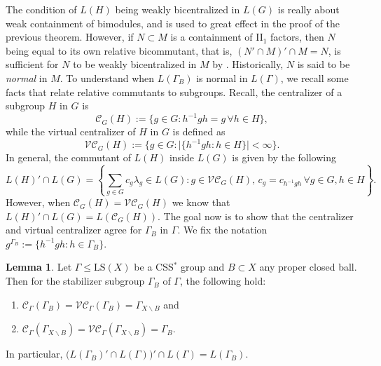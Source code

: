 \documentclass[12pt]{amsart}
\numberwithin{equation}{subsection}
\theoremstyle{definition}
\newtheorem{lemma}[theorem]{Lemma}
\theoremstyle{definition}
\theoremstyle{remark}
\begin{document}
The condition of $L(H)$ being weakly bicentralized in $L(G)$ is really about weak containment of bimodules, and is used to great effect in the proof of the previous theorem. However, if $N \subset M$ is a containment of II$_1$ factors, then $N$ being equal to its own relative bicommutant, that is, $(N ' \cap M )' \cap M = N$, is sufficient for $N$ to be weakly bicentralized in $M$ by \cite[Lemma 3.4]{BannonFull2020}. Historically, $N$ is said to be \emph{normal} in $M$. To understand when $L(\Gamma_B)$ is normal in $L(\Gamma)$, we recall some facts that relate relative commutants to subgroups. Recall, the centralizer of a subgroup $H$ in $G$ is
\[\mathcal{C}_G(H):=\{g\in G: h^{-1}gh=g\, \forall h\in H\},\]
while the virtual centralizer of $H$ in $G$ is defined as
\[\mathcal{VC}_G(H) := \{g\in G : \vert\{h^{-1}gh: h \in H\}\vert < \infty \}.\] 
In general, the commutant of $L(H)$ inside $L(G)$ is given by the following
\[L(H)'\cap L(G)= \left\{ \sum_{g\in G }c_g \lambda_g\in L(G) :  g\in \mathcal{VC}_G(H),\,  c_{g}=c_{h^{-1}gh}\,\forall g\in G,h\in H\right\}.\]
However, when $\mathcal{C}_G(H) = \mathcal{VC}_G(H)$ we know that $L(H)'\cap L(G) = L(\mathcal{C}_G(H))$. The goal now is to show that the centralizer and virtual centralizer agree for $\Gamma_B$ in $\Gamma$. We fix the notation $g^{\Gamma_B} :=\{h^{-1}gh : h \in \Gamma_B \}$.



\begin{lemma}\label{lemma:wkbicentral}
    Let $\Gamma \leq \text{LS}(X)$ be a CSS$^*$ group and $B \subset X$ any proper closed ball. Then for the stabilizer subgroup $\Gamma_B$ of $ \Gamma$, the following hold:
    \begin{enumerate}
        \item \label{vc:1}$\mathcal{C}_\Gamma(\Gamma_B)  = \mathcal{VC}_\Gamma(\Gamma_B) = \Gamma_{X\backslash B}$ and 
        \item \label{vc:2}$\mathcal{C}_\Gamma(\Gamma_{X\backslash B})  = \mathcal{VC}_\Gamma(\Gamma_{X\backslash B}) = \Gamma_B$.
    \end{enumerate}
    In particular, $\big(L(\Gamma_B)'\cap L(\Gamma)\big)'\cap L(\Gamma) = L(\Gamma_B)$.
\end{lemma}
\end{document}
